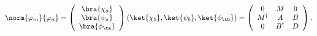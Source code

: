 \begin{equation}
%
\norm{\varphi_{m}}{\varphi_{n}}
=
\left(\begin{array}{c}
        \bra{\chi_{a}} \\
        \bra{\psi_{a}} \\
        \bra{\phi_{\ta}}
\end{array}\right)
%
\left( \ket{\chi_{b}}, \ket{\psi_{b}}, \ket{\phi_{\tb}} \right)
=
%
\left( \begin{array}{ccc}
        0 & M & 0 \\
        M^{\dagger} & A & B \\
        0 & B^{\dagger} & D
\end{array} \right).
\label{eq:matrixab}
%
\end{equation}

